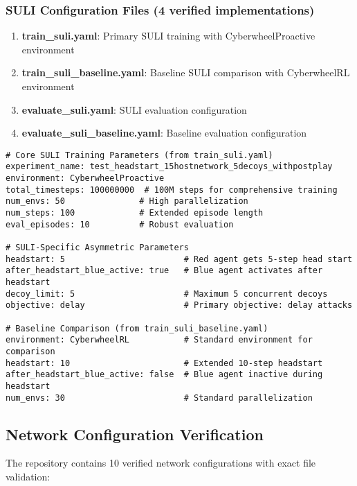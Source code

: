 \documentclass[12pt,a4paper]{article}
\begin{document}
\subsubsection{SULI Configuration Files (4 verified implementations)}
\begin{enumerate}
    \item \textbf{train\_suli.yaml}: Primary SULI training with CyberwheelProactive environment
    \item \textbf{train\_suli\_baseline.yaml}: Baseline SULI comparison with CyberwheelRL environment
    \item \textbf{evaluate\_suli.yaml}: SULI evaluation configuration
    \item \textbf{evaluate\_suli\_baseline.yaml}: Baseline evaluation configuration
\end{enumerate}

\begin{lstlisting}[caption=Verified SULI Configuration Parameters]
# Core SULI Training Parameters (from train_suli.yaml)
experiment_name: test_headstart_15hostnetwork_5decoys_withpostplay
environment: CyberwheelProactive
total_timesteps: 100000000  # 100M steps for comprehensive training
num_envs: 50               # High parallelization
num_steps: 100             # Extended episode length
eval_episodes: 10          # Robust evaluation

# SULI-Specific Asymmetric Parameters
headstart: 5                        # Red agent gets 5-step head start
after_headstart_blue_active: true   # Blue agent activates after headstart
decoy_limit: 5                      # Maximum 5 concurrent decoys
objective: delay                    # Primary objective: delay attacks

# Baseline Comparison (from train_suli_baseline.yaml)
environment: CyberwheelRL           # Standard environment for comparison
headstart: 10                       # Extended 10-step headstart
after_headstart_blue_active: false  # Blue agent inactive during headstart
num_envs: 30                        # Standard parallelization
\end{lstlisting}

\subsection{Network Configuration Verification}

The repository contains 10 verified network configurations with exact file validation:
\end{document}
